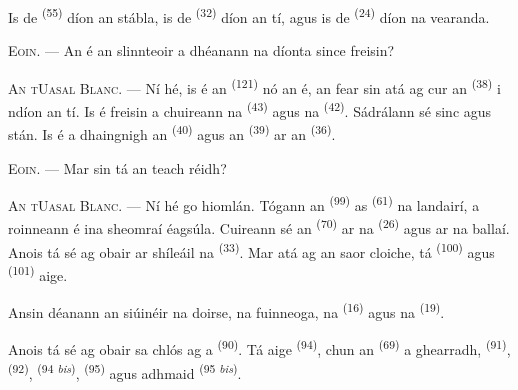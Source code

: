 
Is de  \textsuperscript{(55)} díon an stábla, is de
 \textsuperscript{(32)} díon an tí, agus is de 
\textsuperscript{(24)} díon na vearanda.

\textsc{Eoin}. --- An é an slinnteoir a dhéanann na díonta since freisin?

\textsc{An tUasal Blanc}. --- Ní hé, is é an 
\textsuperscript{(121)} nó an  é, an fear sin atá ag cur an
 \textsuperscript{(38)} i ndíon an tí. Is é freisin a
chuireann na  \textsuperscript{(43)} agus na 
\textsuperscript{(42)}. Sádrálann sé sinc agus stán. Is é a dhaingnigh an
 \textsuperscript{(40)} agus an 
\textsuperscript{(39)} ar an  \textsuperscript{(36)}.

\textsc{Eoin}. --- Mar sin tá an teach réidh?

\VUsaut{3.0mm}
\VUsaut{3.0mm}

\textsc{An tUasal Blanc}. --- Ní hé go hiomlán. Tógann an 
\textsuperscript{(99)} as  \textsuperscript{(61)} na landairí, a
roinneann é ina sheomraí éagsúla. Cuireann sé an 
\textsuperscript{(70)} ar na  \textsuperscript{(26)} agus ar na
ballaí. Anois tá sé ag obair ar shíleáil na 
\textsuperscript{(33)}. Mar atá ag an saor cloiche, tá 
\textsuperscript{(100)} agus  \textsuperscript{(101)} aige.

Ansin déanann an siúinéir na doirse, na fuinneoga, na 
\textsuperscript{(16)} agus na  \textsuperscript{(19)}.

Anois tá sé ag obair sa chlós ag a  \textsuperscript{(90)}.
Tá  aige \textsuperscript{(94)}, chun an 
\textsuperscript{(69)} a ghearradh,  \textsuperscript{(91)},
 \textsuperscript{(92)},  \textsuperscript{(94
\textit{bis})},  \textsuperscript{(95)} agus 
adhmaid \textsuperscript{(95 \textit{bis})}.

